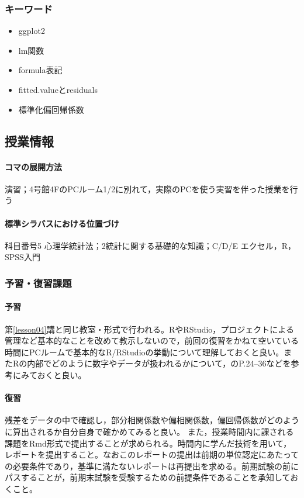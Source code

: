 \subsubsection{キーワード}
\begin{itemize}
\item ggplot2
\item lm関数
\item formula表記
\item fitted.valueとresiduals
\item 標準化偏回帰係数
\end{itemize}
\subsection{授業情報}
\paragraph{コマの展開方法}
演習；4号館4FのPCルーム1/2に別れて，実際のPCを使う実習を伴った授業を行う
\paragraph{標準シラバスにおける位置づけ}
科目番号5 心理学統計法；2統計に関する基礎的な知識；C/D/E エクセル，R，SPSS入門
\subsubsection{予習・復習課題}
\paragraph{予習}
第\ref{lesson04}講と同じ教室・形式で行われる。RやRStudio，プロジェクトによる管理など基本的なことを改めて教示しないので，前回の復習をかねて空いている時間にPCルームで基本的なR/RStudioの挙動について理解しておくと良い。またRの内部でどのように数字やデータが扱われるかについて，\citet{kosugi2019}のP.24--36などを参考にみておくと良い。
\paragraph{復習}
残差をデータの中で確認し，部分相関係数や偏相関係数，偏回帰係数がどのように算出されるか自分自身で確かめてみると良い。
また，授業時間内に課される課題をRmd形式で提出することが求められる。時間内に学んだ技術を用いて，レポートを提出すること。なおこのレポートの提出は前期の単位認定にあたっての必要条件であり，基準に満たないレポートは再提出を求める。前期試験の前にパスすることが，前期末試験を受験するための前提条件であることを承知しておくこと。

